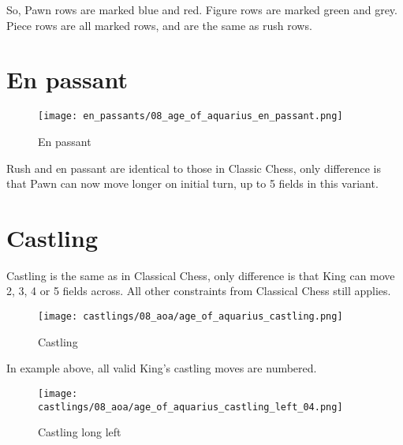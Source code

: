 So, Pawn rows are marked blue and red. Figure rows are marked green and grey.
Piece rows are all marked rows, and are the same as rush rows.

\clearpage %

\section*{En passant}

\noindent
\begin{wrapfigure}{l}{0.4\textwidth}
\centering
\texttt{[image: en\_passants/08\_age\_of\_aquarius\_en\_passant.png]}
\caption{En passant}
\label{fig:08_age_of_aquarius_en_passant}
\end{wrapfigure}
Rush and en passant are identical to those in Classic Chess, only difference
is that Pawn can now move longer on initial turn, up to 5 fields in this
variant.

\clearpage %

\section*{Castling}

Castling is the same as in Classical Chess, only difference is that King can move 2, 3, 4 or 5 fields across.
All other constraints from Classical Chess still applies.

\noindent
\begin{figure}[!h]
\texttt{[image: castlings/08\_aoa/age\_of\_aquarius\_castling.png]}
\caption{Castling}
\label{fig:age_of_aquarius_castling}
\end{figure}

In example above, all valid King's castling moves are numbered.

\noindent
\begin{figure}[!h]
\texttt{[image: castlings/08\_aoa/age\_of\_aquarius\_castling\_left\_04.png]}
\caption{Castling long left}
\label{fig:age_of_aquarius_castling_left_04}
\end{figure}

